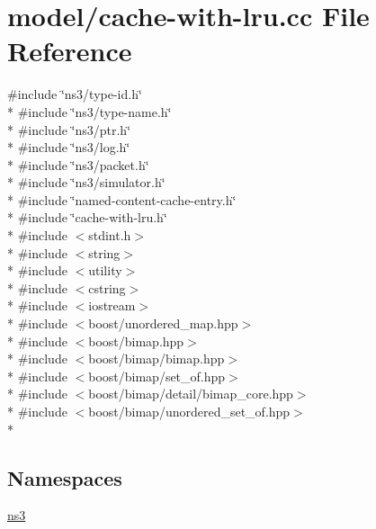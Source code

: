 \hypertarget{cache-with-lru_8cc}{\section{model/cache-\/with-\/lru.cc File Reference}
\label{cache-with-lru_8cc}
}
{\ttfamily \#include \char`\"{}ns3/type-\/id.\-h\char`\"{}}\\*
{\ttfamily \#include \char`\"{}ns3/type-\/name.\-h\char`\"{}}\\*
{\ttfamily \#include \char`\"{}ns3/ptr.\-h\char`\"{}}\\*
{\ttfamily \#include \char`\"{}ns3/log.\-h\char`\"{}}\\*
{\ttfamily \#include \char`\"{}ns3/packet.\-h\char`\"{}}\\*
{\ttfamily \#include \char`\"{}ns3/simulator.\-h\char`\"{}}\\*
{\ttfamily \#include \char`\"{}named-\/content-\/cache-\/entry.\-h\char`\"{}}\\*
{\ttfamily \#include \char`\"{}cache-\/with-\/lru.\-h\char`\"{}}\\*
{\ttfamily \#include $<$stdint.\-h$>$}\\*
{\ttfamily \#include $<$string$>$}\\*
{\ttfamily \#include $<$utility$>$}\\*
{\ttfamily \#include $<$cstring$>$}\\*
{\ttfamily \#include $<$iostream$>$}\\*
{\ttfamily \#include $<$boost/unordered\-\_\-map.\-hpp$>$}\\*
{\ttfamily \#include $<$boost/bimap.\-hpp$>$}\\*
{\ttfamily \#include $<$boost/bimap/bimap.\-hpp$>$}\\*
{\ttfamily \#include $<$boost/bimap/set\-\_\-of.\-hpp$>$}\\*
{\ttfamily \#include $<$boost/bimap/detail/bimap\-\_\-core.\-hpp$>$}\\*
{\ttfamily \#include $<$boost/bimap/unordered\-\_\-set\-\_\-of.\-hpp$>$}\\*
\subsection*{Namespaces}
\begin{DoxyCompactItemize}
\item 
\hyperlink{namespacens3}{ns3}
\end{DoxyCompactItemize}
